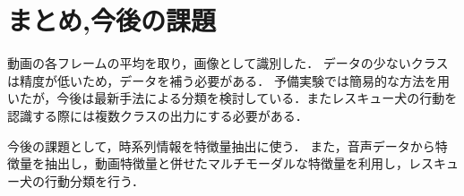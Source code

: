 \chapter{まとめ,今後の課題}
動画の各フレームの平均を取り，画像として識別した．
データの少ないクラスは精度が低いため，データを補う必要がある．
予備実験では簡易的な方法を用いたが，今後は最新手法による分類を検討している．またレスキュー犬の行動を認識する際には複数クラスの出力にする必要がある．


今後の課題として，時系列情報を特徴量抽出に使う．
また，音声データから特徴量を抽出し，動画特徴量と併せたマルチモーダルな特徴量を利用し，レスキュー犬の行動分類を行う．


{\scriptsize %
%


}
% 
% 

